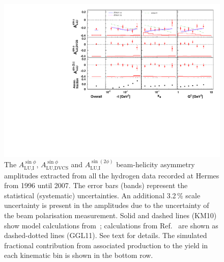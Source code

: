 \begin{figure}
 \begin{center}
 \includegraphics[width=15cm]{bsa_comb}
  \caption{The $A_{\textrm{LU,I}}^{\sin\phi}$, $A_{\textrm{LU,DVCS}}^{\sin\phi}$ and
$A_{\textrm{LU,I}}^{\sin(2\phi)}$ beam-helicity asymmetry amplitudes extracted from all the hydrogen data recorded at H{\sc ermes}
from 1996 until 2007. The error bars (bands) represent the statistical
(systematic) uncertainties. An additional 3.2\,\% scale uncertainty is present in the amplitudes due to the uncertainty of
the beam polarisation measurement. Solid and dashed lines (KM10) show model calculations from~\cite{Kum09}; calculations from Ref.~\cite{Liu11} are shown as dashed-dotted lines (GGL11). See text for details. The simulated fractional contribution from associated production to the yield in each kinematic bin is shown in the bottom row.}
  \label{bsa_xbjrange}
 \end{center}
\end{figure}

